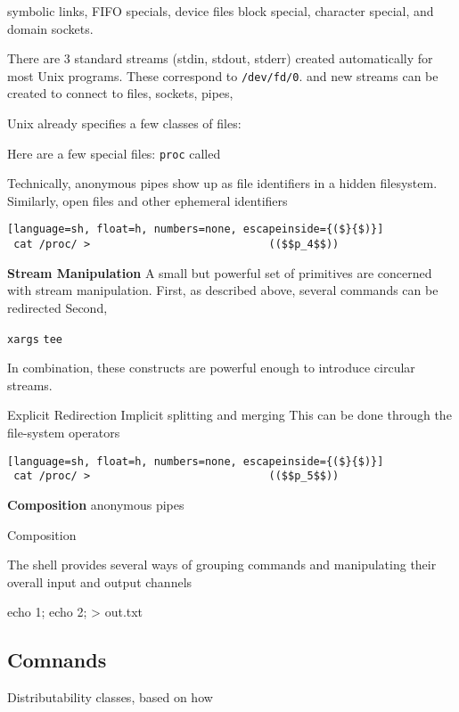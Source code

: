 \documentclass[sigplan,10pt,review,anonymous]{acmart}
\newcommand{\heading}[1]{\vspace{4pt}\noindent\textbf{#1}\enspace}
\newcommand{\ttt}[1]{\texttt{\small #1}}
\begin{document}
symbolic links, FIFO specials, 
device files
block special, character special, 
and domain sockets.

There are 3 standard streams (stdin, stdout, stderr) created automatically for most Unix programs.
These correspond to \ttt{/dev/fd/0}.
and new streams can be created to connect to files, sockets, pipes,

Unix already specifies a few classes of files:

Here are a few special files:
  \ttt{proc} called 

Technically, anonymous pipes show up as file identifiers in a hidden filesystem.
Similarly, open files and other ephemeral identifiers 


\begin{lstlisting}[language=sh, float=h, numbers=none, escapeinside={($}{$)}]
 cat /proc/ >                            (($$p_4$$))
\end{lstlisting}

\heading{Stream Manipulation}
A small but powerful set of primitives are concerned with stream manipulation.
First, as described above, several commands can be redirected
Second, 

\ttt{xargs}
\ttt{tee}

In combination, these constructs are powerful enough to introduce circular streams. %

Explicit Redirection
Implicit splitting and merging 
This can be done through the file-system operators 

\begin{lstlisting}[language=sh, float=h, numbers=none, escapeinside={($}{$)}]
 cat /proc/ >                            (($$p_5$$))
\end{lstlisting}

\heading{Composition}
anonymous pipes

Composition

The shell provides several ways of grouping commands and manipulating their
overall input and output channels 

{ echo 1; echo 2; } > out.txt

\subsection{Comnands}
\label{bg:cmd}


Distributability classes, based on how 
\end{document}
